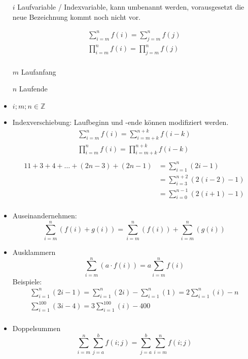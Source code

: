 \begin{itemize}
    \item[$i$] Laufvariable / Indexvariable, kann umbenannt werden, vorausgesetzt die neue Bezeichnung kommt noch nicht vor.
    \item[] \begin{gather*}
                \sum\limits_{i = m}^n f(i) = \sum\limits_{j = m}^n f(j)\\
                \prod\limits_{i = m}^n f(i) = \prod\limits_{j = m}^n f(j)\\
    \end{gather*}
    \item[$m$] Laufanfang
    \item[$n$] Laufende
    \item $i;m;n \in \mathbb{Z}$
    \item Indexverschiebung: Laufbeginn und -ende können modifiziert werden.
    \begin{gather*}
        \sum\limits_{i=m}^n f(i) = \sum\limits_{i=m+k}^{n+k} f(i-k)\\
        \prod\limits_{i=m}^n f(i) = \prod\limits_{i=m+k}^{n+k} f(i-k)\\
    \end{gather*}
    \begin{alignat*}{1}
        1+3+4+\dots+(2n-3)+(2n-1) & = \sum\limits_{i = 1}^n (2i-1)             \\
        & = \sum\limits_{i = 3}^{n + 2} (2(i - 2)-1) \\
        & = \sum\limits_{i = 0}^{n - 1} (2(i + 1)-1) \\
    \end{alignat*}
    \item Auseinandernehmen:
    \[\sum\limits_{i=m}^n (f(i) + g(i)) = \sum\limits_{i=m}^n (f(i)) + \sum\limits_{i=m}^n (g(i))\]
    \item Ausklammern
    \[\sum\limits_{i=m}^n (a \cdot f(i)) = a \sum\limits_{i=m}^n f(i)\]
    Beispiele:
    \begin{gather*}
        \sum\limits_{i=1}^n (2i-1) = \sum\limits_{i=1}^n (2i) - \sum\limits_{i=1}^n (1) = 2\sum\limits_{i=1}^n (i) - n\\
        \sum\limits_{i=1}^{100} (3i-4) = 3\sum\limits_{i=1}^{100} (i) - 400\\
    \end{gather*}
    \item Doppelsummen
    \[\sum\limits_{i=m}^n \sum\limits_{j=a}^b f(i; j) = \sum\limits_{j=a}^b \sum\limits_{i=m}^n f(i; j)\]
\end{itemize}
